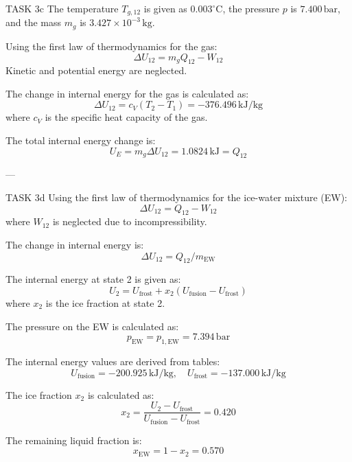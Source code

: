 TASK 3c  
The temperature \( T_{g,12} \) is given as \( 0.003^\circ\text{C} \), the pressure \( p \) is \( 7.400 \, \text{bar} \), and the mass \( m_g \) is \( 3.427 \times 10^{-3} \, \text{kg} \).  

Using the first law of thermodynamics for the gas:  
\[
\Delta U_{12} = m_g Q_{12} - W_{12}
\]  
Kinetic and potential energy are neglected.  

The change in internal energy for the gas is calculated as:  
\[
\Delta U_{12} = c_V (T_2 - T_1) = -376.496 \, \text{kJ/kg}
\]  
where \( c_V \) is the specific heat capacity of the gas.  

The total internal energy change is:  
\[
U_E = m_g \Delta U_{12} = 1.0824 \, \text{kJ} = Q_{12}
\]  

---

TASK 3d  
Using the first law of thermodynamics for the ice-water mixture (EW):  
\[
\Delta U_{12} = Q_{12} - W_{12}
\]  
where \( W_{12} \) is neglected due to incompressibility.  

The change in internal energy is:  
\[
\Delta U_{12} = Q_{12} / m_{\text{EW}}
\]  

The internal energy at state 2 is given as:  
\[
U_2 = U_{\text{frost}} + x_2 (U_{\text{fusion}} - U_{\text{frost}})
\]  
where \( x_2 \) is the ice fraction at state 2.  

The pressure on the EW is calculated as:  
\[
p_{\text{EW}} = p_{1,\text{EW}} = 7.394 \, \text{bar}
\]  

The internal energy values are derived from tables:  
\[
U_{\text{fusion}} = -200.925 \, \text{kJ/kg}, \quad U_{\text{frost}} = -137.000 \, \text{kJ/kg}
\]  

The ice fraction \( x_2 \) is calculated as:  
\[
x_2 = \frac{U_2 - U_{\text{frost}}}{U_{\text{fusion}} - U_{\text{frost}}} = 0.420
\]  

The remaining liquid fraction is:  
\[
x_{\text{EW}} = 1 - x_2 = 0.570
\]